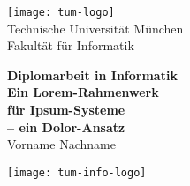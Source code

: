 %



\thispagestyle{empty}

\begin{center}
    \texttt{[image: tum-logo]}\\
    \vspace{.5cm}
    {\Large \sc Technische Universität München}\\

    \vspace{1cm}
    {\Huge \sc Fakultät für Informatik\\[1mm]}


    \vspace{2cm}
    {\Large \textbf{Diplomarbeit in Informatik}}\\
    \vspace{2.0cm}
    {\Huge \textbf{Ein Lorem-Rahmenwerk}}\\ %
    \vspace*{3mm}
    {\Huge \textbf{für Ipsum-Systeme}}\\
    \vspace*{3mm}
    {\Huge \textbf{-- ein Dolor-Ansatz}}\\
    \vspace{1.5cm}
    Vorname Nachname

    \vspace{5cm} %
    \texttt{[image: tum-info-logo]}
\end{center}

\newpage


\thispagestyle{empty}
\cleardoublepage


\thispagestyle{empty}

